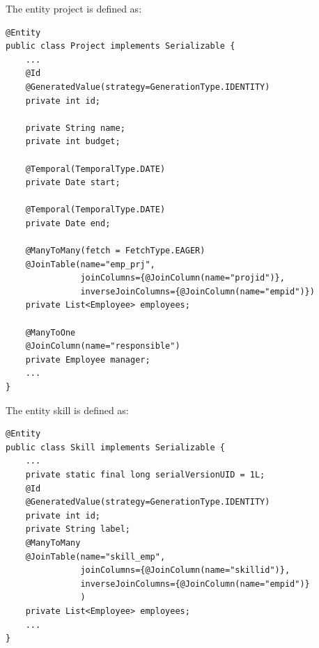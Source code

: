 The entity project is defined as:  
\begin{lstlisting}[style=Java]
@Entity
public class Project implements Serializable {
    ...
    @Id
    @GeneratedValue(strategy=GenerationType.IDENTITY)
    private int id;

    private String name;
    private int budget;

    @Temporal(TemporalType.DATE)
    private Date start;

    @Temporal(TemporalType.DATE)
    private Date end;

    @ManyToMany(fetch = FetchType.EAGER)
    @JoinTable(name="emp_prj",
               joinColumns={@JoinColumn(name="projid")}, 
               inverseJoinColumns={@JoinColumn(name="empid")})
    private List<Employee> employees;

    @ManyToOne
    @JoinColumn(name="responsible")
    private Employee manager;
    ...
}
\end{lstlisting}
The entity skill is defined as:  
\begin{lstlisting}[style=Java]
@Entity
public class Skill implements Serializable {
    ...
    private static final long serialVersionUID = 1L;
    @Id
    @GeneratedValue(strategy=GenerationType.IDENTITY)
    private int id;
    private String label;
    @ManyToMany
    @JoinTable(name="skill_emp",
               joinColumns={@JoinColumn(name="skillid")},
               inverseJoinColumns={@JoinColumn(name="empid")}
               )
    private List<Employee> employees;
    ... 
}
\end{lstlisting}